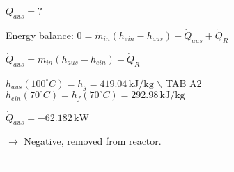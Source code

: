 \( \dot{Q}_{aus} = ? \)  

Energy balance:  
\( 0 = \dot{m}_{in} (h_{ein} - h_{aus}) + \dot{Q}_{aus} + \dot{Q}_R \)  

\( \dot{Q}_{aus} = \dot{m}_{in} (h_{aus} - h_{ein}) - \dot{Q}_R \)  

\( h_{aus} (100^\circ C) = h_g = 419.04 \, \text{kJ/kg} \) \(\backslash\) TAB A2  
\( h_{ein} (70^\circ C) = h_f (70^\circ C) = 292.98 \, \text{kJ/kg} \)  

\( \dot{Q}_{aus} = -62.182 \, \text{kW} \)  

\( \rightarrow \) Negative, removed from reactor.  

---